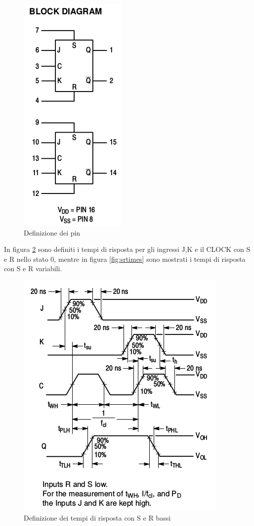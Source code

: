 \documentclass[journal, a4paper]{IEEEtran}
\begin{document}
\begin{figure}[htp]
\centering
\includegraphics[scale=.4]{scheme}
\caption{Definizione dei pin}
\label{fig:defpin}
\end{figure}

In figura \ref{fig:times} sono definiti i tempi di risposta per gli ingressi J,K e il CLOCK con S e R nello stato 0, mentre in figura \ref{fig:srtimes} sono mostrati i tempi di risposta con S e R variabili.

\begin{figure}[htp]
\centering
\includegraphics[scale=.4]{times}
\caption{Definizione dei tempi di risposta con S e R bassi}
\label{fig:times}
\end{figure}
\end{document}

